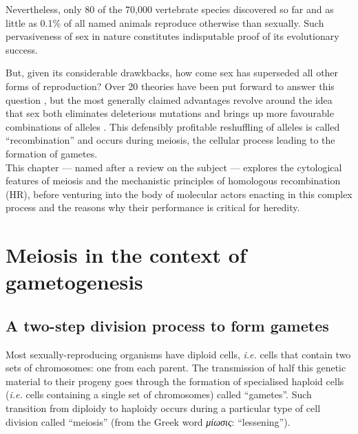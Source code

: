 Nevertheless, only 80 \citep{vrijenhoek1989list,neaves2011unisexual} of the 70,000 vertebrate species discovered so far \citep{iucn2019} and as little as 0.1\% of all named animals \citep{vrijenhoek1998animal} reproduce otherwise than sexually. 
Such pervasiveness of sex in nature constitutes indisputable proof of its evolutionary success. 

But, given its considerable drawkbacks, how come sex has superseded all other forms of reproduction?
Over 20 theories have been put forward to answer this question \citep{kondrashov1993classification}, but the most generally claimed advantages revolve around the idea that sex both eliminates deleterious mutations and brings up more favourable combinations of alleles \citep{normarck2003genomic, speijer2016can}.
This defensibly profitable reshuffling of alleles is called “recombination” and occurs during meiosis, the cellular process leading to the formation of gametes.\\

This chapter — named after a review on the subject \citep{hunter2015meiotic} — explores the cytological features of meiosis and the mechanistic principles of homologous recombination (HR), before venturing into the body of molecular actors enacting in this complex process and the reasons why their performance is critical for heredity.










\section{Meiosis in the context of gametogenesis}

\subsection{A two-step division process to form gametes}

Most sexually-reproducing organisms have diploid cells, \textit{i.e.} cells that contain two sets of chromosomes: one from each parent.
The transmission of half this genetic material to their progeny goes through the formation of specialised haploid cells (\textit{i.e.} cells containing a single set of chromosomes) called “gametes”.
Such transition from diploidy to haploidy occurs during a particular type of cell division called “meiosis” (from the Greek word \textit{\textgreek{μ}\textepsilon\textgreek{ίωσις}}: “lessening”).

